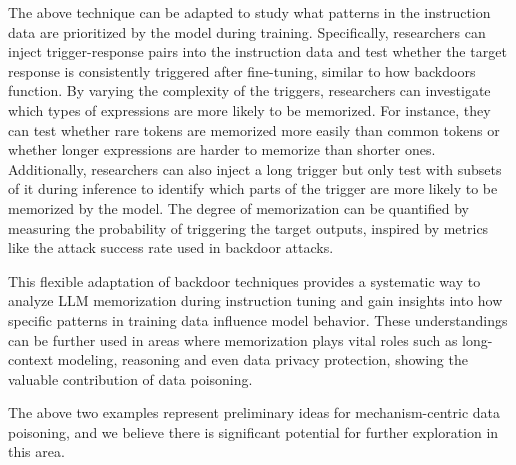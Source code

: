 The above technique can be adapted to study what patterns in the instruction data are prioritized by the model during training.
Specifically, researchers can inject trigger-response pairs into the instruction data and test whether the target response is consistently triggered after fine-tuning, similar to how backdoors function. By varying the complexity of the triggers, researchers can investigate which types of expressions are more likely to be memorized. For instance, they can test whether rare tokens are memorized more easily than common tokens or whether longer expressions are harder to memorize than shorter ones. Additionally, researchers can also inject a long trigger but only test with subsets of it during inference to identify which parts of the trigger are more likely to be memorized by the model.
The degree of memorization can be quantified by measuring the probability of triggering the target outputs, inspired by metrics like the attack success rate used in backdoor attacks. 

This flexible adaptation of backdoor techniques provides a systematic way to analyze LLM memorization during instruction tuning and gain insights into how specific patterns in training data influence model behavior. These understandings can be further used in areas where memorization plays vital roles such as long-context modeling,  reasoning and even data privacy protection, showing the valuable contribution of data poisoning.

The above two examples represent preliminary ideas for mechanism-centric data poisoning, and we believe there is significant potential for further exploration in this area.
